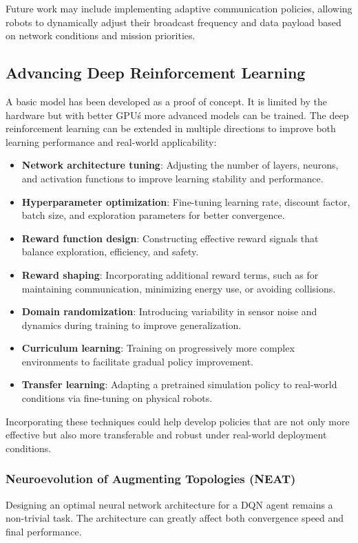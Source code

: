 Future work may include implementing adaptive communication policies, allowing robots to dynamically adjust their broadcast frequency and data payload based on network conditions and mission priorities.

\subsection{Advancing Deep Reinforcement Learning}
A basic model has been developed as a proof of concept. {\color{red}It is limited by the hardware but with better GPU\'s more advanced models can be trained.}
The deep reinforcement learning can be extended in multiple directions to improve both learning performance and real-world applicability:

\begin{itemize}
  \item \textbf{Network architecture tuning}: Adjusting the number of layers, neurons, and activation functions to improve learning stability and performance.
  \item \textbf{Hyperparameter optimization}: Fine-tuning learning rate, discount factor, batch size, and exploration parameters for better convergence.
  \item \textbf{Reward function design}: Constructing effective reward signals that balance exploration, efficiency, and safety.
  \item \textbf{Reward shaping}: Incorporating additional reward terms, such as for maintaining communication, minimizing energy use, or avoiding collisions.
  \item \textbf{Domain randomization}: Introducing variability in sensor noise and dynamics during training to improve generalization.
  \item \textbf{Curriculum learning}: Training on progressively more complex environments to facilitate gradual policy improvement.
  \item \textbf{Transfer learning}: Adapting a pretrained simulation policy to real-world conditions via fine-tuning on physical robots.
\end{itemize}

Incorporating these techniques could help develop policies that are not only more effective but also more transferable and robust under real-world deployment conditions.

\subsubsection{Neuroevolution of Augmenting Topologies (NEAT)}
Designing an optimal neural network architecture for a DQN agent remains a non-trivial task. The architecture can greatly affect both convergence speed and final performance.\\

